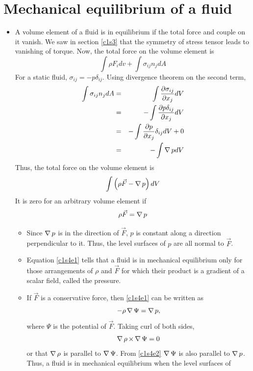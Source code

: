 \section{Mechanical equilibrium of a fluid}\label{c1s4}
\begin{itemize}
\item A volume element of a fluid is in equilibrium if the total force and couple on it vanish. We saw in section \ref{c1s3} that the symmetry of stress tensor leads to vanishing of 
torque. Now, the total force on the volume element is
\[
\int\rho F_i dv + \int\sigma_{ij}n_j dA
\]
For a static fluid, $\sigma_{ij} = -p\delta_{ij}$. Using divergence theorem on the 
second term,
\begin{eqnarray*}
\int \sigma_{ij}n_j dA &=& \int \frac{\partial\sigma_{ij}}{\partial x_j} dV \\
 &=& -\int \frac{\partial{p\delta_{ij}}}{\partial{x_j}} dV \\
 &=& -\int \frac{\partial{p}}{\partial{x_j}}\delta_{ij} dV + 0 \\
 &=& -\int \operatorname{\nabla}{p}dV
\end{eqnarray*}
Thus, the total force on the volume element is
\[
\int \left(\rho\vec{F} - \operatorname{\nabla}{p}\right) dV
\]
It is zero for an arbitrary volume element if
\begin{equation}\label{c1s4e1}
\rho\vec{F} = \operatorname{\nabla}{p}
\end{equation}
\begin{itemize}
\item Since $\operatorname{\nabla}{p}$ is in the direction of $\vec{F}$, $p$ is constant along a direction perpendicular to it. Thus, the level surfaces of $p$ are all normal to $\vec{F}$.
\item Equation \eqref{c1s4e1} tells that a fluid is in mechanical equilibrium only for those arrangements of $\rho$ and $\vec{F}$ for which their product is a gradient of a scalar field, 
called the pressure.
\item If $\vec{F}$ is a conservative force, then \eqref{c1s4e1} can be written as 
\begin{equation}\label{c1s4e2}
-\rho\operatorname{\nabla}{\Psi} = \operatorname{\nabla}{p},
\end{equation}
where $\Psi$ is the potential of $\vec{F}$. Taking curl of both sides,
\begin{equation}\label{c1s4e3}
\operatorname{\nabla}{\rho} \operatorname{\times} \operatorname{\nabla}{\Psi} = 0
\end{equation}
or that $\operatorname{\nabla}{\rho}$ is parallel to $\operatorname{\nabla}{\Psi}$. From \eqref{c1s4e2} $\operatorname{\nabla}{\Psi}$ is also parallel to $\operatorname{\nabla}{p}$. Thus, a fluid is in mechanical equilibrium when the level surfaces of

\end{itemize}
\end{itemize}
